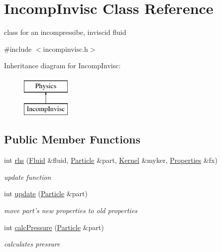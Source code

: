 \hypertarget{classIncompInvisc}{\section{\-Incomp\-Invisc \-Class \-Reference}
\label{classIncompInvisc}
}


class for an incompressibe, inviscid fluid  




{\ttfamily \#include $<$incompinvisc.\-h$>$}

\-Inheritance diagram for \-Incomp\-Invisc\-:\begin{figure}[H]
\begin{center}
\leavevmode
\includegraphics[height=2.000000cm]{classIncompInvisc}
\end{center}
\end{figure}
\subsection*{\-Public \-Member \-Functions}
\begin{DoxyCompactItemize}
\item 
int \hyperlink{classIncompInvisc_a06fbd0a590ef1ef102352a094ae4c698}{rhs} (\hyperlink{classFluid}{\-Fluid} \&fluid, \hyperlink{classParticle}{\-Particle} \&part, \hyperlink{classKernel}{\-Kernel} \&myker, \hyperlink{structProperties}{\-Properties} \&fx)
\begin{DoxyCompactList}\small\item\em update function \end{DoxyCompactList}\item 
\hypertarget{classIncompInvisc_a06483b536f7464b593b55fe4d11a45ce}{int \hyperlink{classIncompInvisc_a06483b536f7464b593b55fe4d11a45ce}{update} (\hyperlink{classParticle}{\-Particle} \&part)}\label{classIncompInvisc_a06483b536f7464b593b55fe4d11a45ce}

\begin{DoxyCompactList}\small\item\em move part's new properties to old properties \end{DoxyCompactList}\item 
\hypertarget{classIncompInvisc_a4363561397ee2a76b67c23851fbaced5}{int \hyperlink{classIncompInvisc_a4363561397ee2a76b67c23851fbaced5}{calc\-Pressure} (\hyperlink{classParticle}{\-Particle} \&part)}\label{classIncompInvisc_a4363561397ee2a76b67c23851fbaced5}

\begin{DoxyCompactList}\small\item\em calculates pressure \end{DoxyCompactList}\end{DoxyCompactItemize}


